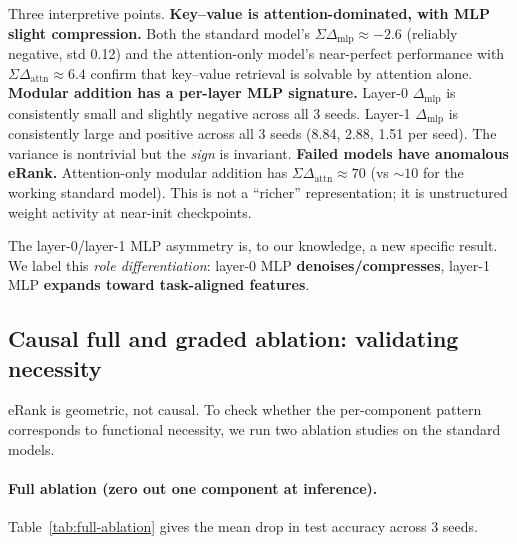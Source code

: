 \documentclass{article}
\begin{document}
Three interpretive points. \textbf{Key--value is attention-dominated, with MLP slight compression.} Both the standard model's $\Sigma\Delta_{\text{mlp}}\approx -2.6$ (reliably negative, std 0.12) and the attention-only model's near-perfect performance with $\Sigma\Delta_{\text{attn}}\approx 6.4$ confirm that key--value retrieval is solvable by attention alone. \textbf{Modular addition has a per-layer MLP signature.} Layer-0 $\Delta_{\text{mlp}}$ is consistently small and slightly negative across all 3 seeds. Layer-1 $\Delta_{\text{mlp}}$ is consistently large and positive across all 3 seeds (8.84, 2.88, 1.51 per seed). The variance is nontrivial but the \emph{sign} is invariant. \textbf{Failed models have anomalous eRank.} Attention-only modular addition has $\Sigma\Delta_{\text{attn}}\approx 70$ (vs $\sim 10$ for the working standard model). This is not a ``richer'' representation; it is unstructured weight activity at near-init checkpoints.

The layer-0/layer-1 MLP asymmetry is, to our knowledge, a new specific result. We label this \emph{role differentiation}: layer-0 MLP \textbf{denoises/compresses}, layer-1 MLP \textbf{expands toward task-aligned features}.

\subsection{Causal full and graded ablation: validating necessity}
\label{sec:ablation}

eRank is geometric, not causal. To check whether the per-component pattern corresponds to functional necessity, we run two ablation studies on the standard models.

\paragraph{Full ablation (zero out one component at inference).}
Table~\ref{tab:full-ablation} gives the mean drop in test accuracy across 3 seeds.
\end{document}

